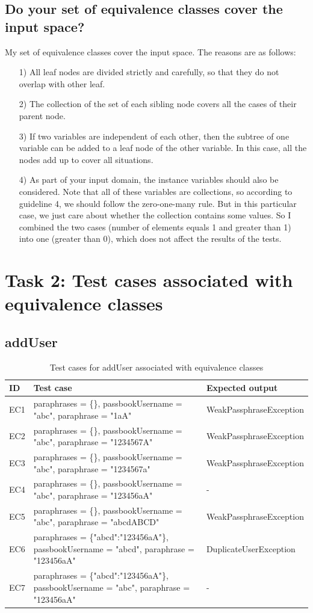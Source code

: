 \documentclass{article}
\begin{document}
\subsection{Do your set of equivalence classes cover the input space?}
My set of equivalence classes cover the input space. The reasons are as follows:
\begin{itemize}
\item [1)] All leaf nodes are divided strictly and carefully, so that they do not overlap with other leaf.
\item [2)] The collection of the set of each sibling node covers all the cases of their parent node.
\item [3)]
If two variables are independent of each other, then the subtree of one variable can be added to a leaf node of the other variable. In this case, all the nodes add up to cover all situations.
\item [4)]
As part of your input domain, the instance variables should also be considered. Note that all of these variables are collections, so according to guideline 4, we should follow the zero-one-many rule. But in this particular case, we just care about whether the collection contains some values. So I combined the two cases (number of elements equals 1 and greater than 1) into one (greater than 0), which does not affect the results of the tests.
\end{itemize}

\section{Task 2: Test cases associated with equivalence classes}
\subsection{addUser}

\begin{longtable}{|p{2cm}|p{7cm}|p{5cm}|}
\caption{Test cases for addUser associated with equivalence classes}\\
\hline 
ID&Test case&Expected output\\
\hline  
EC1&paraphrases = \{\}, passbookUsername = "abc", paraphrase = "1aA"&WeakPassphraseException\\
\hline
EC2&paraphrases = \{\}, passbookUsername = "abc", paraphrase = "1234567A"&WeakPassphraseException\\
\hline
EC3&paraphrases = \{\}, passbookUsername = "abc", paraphrase = "1234567a"&WeakPassphraseException\\
\hline
EC4&paraphrases = \{\}, passbookUsername = "abc", paraphrase = "123456aA"&-\\
\hline
EC5&paraphrases = \{\}, passbookUsername = "abc", paraphrase = "abcdABCD"&WeakPassphraseException\\
\hline
EC6&paraphrases = \{"abcd":"123456aA"\}, passbookUsername = "abcd", paraphrase = "123456aA"&DuplicateUserException\\
\hline
EC7&paraphrases = \{"abcd":"123456aA"\}, passbookUsername = "abc", paraphrase = "123456aA"&-\\
\hline
\end{longtable}
\end{document}
